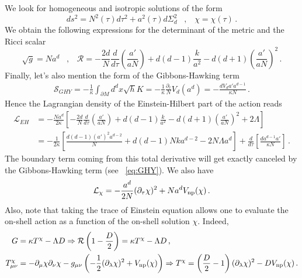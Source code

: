 \documentclass[a4paper]{article}
\def\sp{\;\;\;,\;\;\;}
\begin{document}
We look for homogeneous and isotropic solutions of the form
\begin{equation}
  ds^2= N^2(\tau)d\tau^2 + a^2(\tau) d \Sigma_{d}^2\sp \chi=\chi(\tau)\,.
\end{equation}
We obtain the following expressions for the determinant of the metric and the Ricci scalar
\begin{equation}
  \sqrt{g}=N a^d\sp \mathcal{R}=-\frac{2d}{N} \frac{d}{d\tau}\left(\frac{a'}{aN}\right)+d(d-1)\frac{k}{a^2}-d(d+1)\left(\frac{a'}{aN}\right)^2\,.
\end{equation}
Finally, let's also mention the form of the Gibbons-Hawking term
\begin{equation}\label{eq:GHY}
  \begin{aligned}
    \mathcal{S}_{GHY} = -\frac{1}{\kappa}\int_{\partial M} d^d x \sqrt{h} K = -\frac{1}{\kappa}\frac{\partial_\tau}{N}V_d (a^d) = -\frac{d V_d a' a^{d-1}}{\kappa N}\,. 
  \end{aligned}
\end{equation}
Hence the Lagrangian density of the Einstein-Hilbert part of the action reads
\begin{equation}
  \begin{aligned}
    \mathcal{L}_{EH} &= -\frac{N a^d}{2\kappa}\left[-\frac{2d}{N} \frac{d}{d\tau}\left(\frac{a'}{aN}\right)+d(d-1)\frac{k}{a^2}-d(d+1)\left(\frac{a'}{aN}\right)^2+2\Lambda\right]\\
    &= -\frac{1}{2\kappa}\left[\frac{d(d-1)(a')^2 a^{d-2}}{N} + d(d-1) N k a^{d-2} - 2 N \Lambda a^{d}\right] + \frac{d}{d\tau}\left[\frac{d a^{d-1} a' }{\kappa N}\right]\,.
  \end{aligned}
\end{equation}
The boundary term coming from this total derivative will get exactly canceled by the Gibbons-Hawking term (see ~\eqref{eq:GHY}).
We also have
\begin{equation}
  \mathcal{L}_{\chi}=-\frac{a^d}{2N}(\partial_\tau \chi)^2 + N a^{d} V_{\rm np}(\chi)\,.
\end{equation}
Also, note that taking the trace of Einstein equation allows one to evaluate the on-shell action as a function of the on-shell solution $\chi$. Indeed,
\begin{equation}
\begin{aligned}
  G &= \kappa T^{\chi} - \Lambda D \Rightarrow \mathcal{R}\left(1-\frac{D}{2}\right)=\kappa T^{\chi} - \Lambda D\,,\\
  T_{\mu \nu}^{\chi}&= -\partial_\mu \chi \partial_\nu \chi -g_{\mu\nu}\left(-\frac{1}{2}(\partial_\lambda \chi)^2+V_{\rm np}(\chi)\right) \Rightarrow T^{\chi}=\left(\frac{D}{2}-1\right)(\partial_\lambda \chi)^2 - D V_{\rm np}(\chi)\,.
\end{aligned}
\end{equation}
\end{document}
